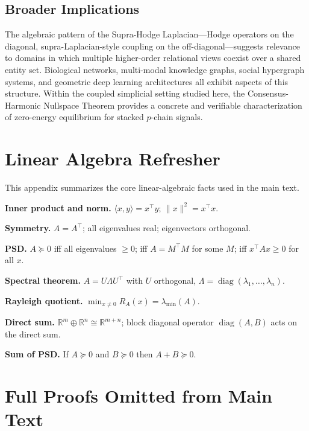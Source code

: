 \documentclass[11pt]{article}
\theoremstyle{definition}
\theoremstyle{remark}
\newcommand{\R}{\mathbb{R}}
\DeclareMathOperator{\diag}{diag}
\begin{document}
\subsection{Broader Implications}

The algebraic pattern of the Supra-Hodge Laplacian---Hodge operators on the
diagonal, supra-Laplacian-style coupling on the off-diagonal---suggests
relevance to domains in which multiple higher-order relational views coexist
over a shared entity set. Biological networks, multi-modal knowledge graphs,
social hypergraph systems, and geometric deep learning architectures all
exhibit aspects of this structure. Within the coupled simplicial setting
studied here, the Consensus-Harmonic Nullspace Theorem provides a concrete and
verifiable characterization of zero-energy equilibrium for stacked $p$-chain
signals.


\appendix

\clearpage
\section{Linear Algebra Refresher}
\label{app:linalg}

This appendix summarizes the core linear-algebraic facts used in the main text.

\textbf{Inner product and norm.} $\langle x,y\rangle = x^\top y$;
$\|x\|^2 = x^\top x$.

\textbf{Symmetry.} $A=A^\top$; all eigenvalues real; eigenvectors orthogonal.

\textbf{PSD.} $A\succeq 0$ iff all eigenvalues $\geq 0$; iff $A=M^\top M$ for
some $M$; iff $x^\top Ax\geq 0$ for all $x$.

\textbf{Spectral theorem.} $A=U\Lambda U^\top$ with $U$ orthogonal,
$\Lambda=\diag(\lambda_1,\dots,\lambda_n)$.

\textbf{Rayleigh quotient.} $\min_{x\neq 0}R_A(x)=\lambda_{\min}(A)$.

\textbf{Direct sum.} $\R^m\oplus\R^n\cong\R^{m+n}$; block diagonal operator
$\diag(A,B)$ acts on the direct sum.

\textbf{Sum of PSD.} If $A\succeq 0$ and $B\succeq 0$ then $A+B\succeq 0$.

\clearpage
\section{Full Proofs Omitted from Main Text}
\label{app:proofs}
\end{document}
